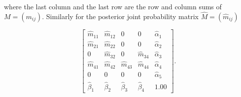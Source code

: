 \documentclass[11pt]{article}
\begin{document}
where the last column and the last row are the row and column sums of
$M=(m_{ij})$. Similarly for the posterior joint probability matrix
$\hat{M}=(\hat{m}_{ij})$

\begin{equation}
  \label{eq:p6}
      \left[
      \begin{array}{ccccc}
        \hat{m}_{11} & \hat{m}_{12} & 0 & 0 & \hat{\alpha}_{1} \\
        \hat{m}_{21} & \hat{m}_{22} & 0 & 0 & \hat{\alpha}_{2} \\
        0 & \hat{m}_{32} & 0 & \hat{m}_{34} & \hat{\alpha}_{3} \\
        \hat{m}_{41} & \hat{m}_{42} & \hat{m}_{43} & \hat{m}_{44} & \hat{\alpha}_{4} \\
        0 & 0 & 0 & 0 & \hat{\alpha}_{5} \\
        \hat{\beta}_{1} & \hat{\beta}_{2} & \hat{\beta}_{3} & \hat{\beta}_{4} & 1.00
      \end{array}
\right].
\end{equation}






\end{document}
